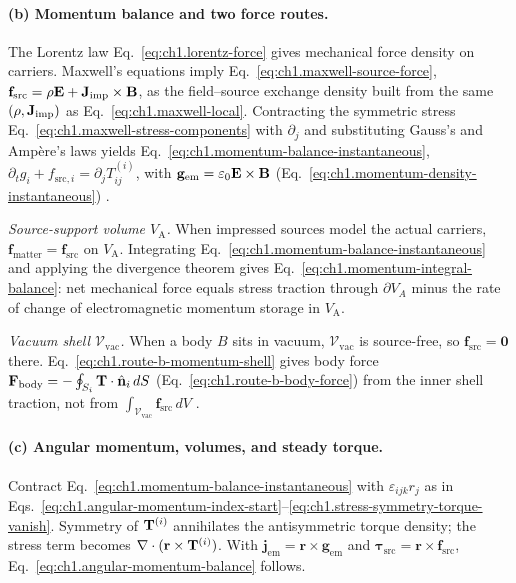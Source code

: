 \paragraph{(b) Momentum balance and two force routes.}
The Lorentz law Eq.~\eqref{eq:ch1.lorentz-force} gives mechanical force density on carriers. Maxwell's equations imply Eq.~\eqref{eq:ch1.maxwell-source-force}, $\mathbf{f}_{\mathrm{src}}=\rho\mathbf{E}+\mathbf{J}_{\mathrm{imp}}\times\mathbf{B}$, as the field--source exchange density built from the same $(\rho,\mathbf{J}_{\mathrm{imp}})$ as Eq.~\eqref{eq:ch1.maxwell-local}. Contracting the symmetric stress Eq.~\eqref{eq:ch1.maxwell-stress-components} with $\partial_j$ and substituting Gauss's and Amp\`ere's laws yields Eq.~\eqref{eq:ch1.momentum-balance-instantaneous}, $\partial_t g_i+f_{\mathrm{src},i}=\partial_j T^{(i)}_{ij}$, with $\mathbf{g}_{\mathrm{em}}=\varepsilon_0\mathbf{E}\times\mathbf{B}$ (Eq.~\eqref{eq:ch1.momentum-density-instantaneous}) \cite{maxwell1873,stratton1941}.

\textit{Source-support volume $V_{\mathrm{A}}$.} When impressed sources model the actual carriers, $\mathbf{f}_{\mathrm{matter}}=\mathbf{f}_{\mathrm{src}}$ on $V_{\mathrm{A}}$. Integrating Eq.~\eqref{eq:ch1.momentum-balance-instantaneous} and applying the divergence theorem gives Eq.~\eqref{eq:ch1.momentum-integral-balance}: net mechanical force equals stress traction through $\partial V_A$ minus the rate of change of electromagnetic momentum storage in $V_{\mathrm{A}}$.

\textit{Vacuum shell $\mathcal{V}_{\mathrm{vac}}$.} When a body $B$ sits in vacuum, $\mathcal{V}_{\mathrm{vac}}$ is source-free, so $\mathbf{f}_{\mathrm{src}}=\mathbf{0}$ there. Eq.~\eqref{eq:ch1.route-b-momentum-shell} gives body force $\mathbf{F}_{\mathrm{body}}=-\oint_{S_i}\mathbf{T}\cdot\hat{\mathbf{n}}_i\,dS$ (Eq.~\eqref{eq:ch1.route-b-body-force}) from the inner shell traction, not from $\int_{\mathcal{V}_{\mathrm{vac}}}\mathbf{f}_{\mathrm{src}}\,dV$ \cite{stratton1941,harrington2001}.

\paragraph{(c) Angular momentum, volumes, and steady torque.}
Contract Eq.~\eqref{eq:ch1.momentum-balance-instantaneous} with $\varepsilon_{ijk}r_j$ as in Eqs.~\eqref{eq:ch1.angular-momentum-index-start}--\eqref{eq:ch1.stress-symmetry-torque-vanish}. Symmetry of $\mathbf{T}^{(i)}$ annihilates the antisymmetric torque density; the stress term becomes $\nabla\cdot(\mathbf{r}\times\mathbf{T}^{(i)})$. With $\mathbf{j}_{\mathrm{em}}=\mathbf{r}\times\mathbf{g}_{\mathrm{em}}$ and $\boldsymbol{\tau}_{\mathrm{src}}=\mathbf{r}\times\mathbf{f}_{\mathrm{src}}$, Eq.~\eqref{eq:ch1.angular-momentum-balance} follows.

